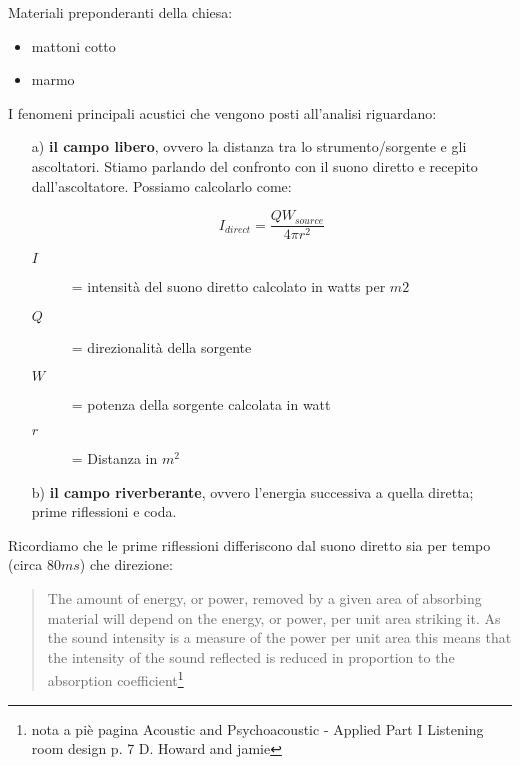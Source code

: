 Materiali preponderanti della chiesa:

\begin{itemize}
	\item mattoni cotto
	\item marmo
\end{itemize}

I fenomeni principali acustici che vengono posti all'analisi riguardano:

\begin{enumerate}
	\item[a)] \textbf{il campo libero}, ovvero la distanza tra lo strumento/sorgente e gli ascoltatori. 
Stiamo parlando del confronto con il suono diretto e recepito dall'ascoltatore. Possiamo calcolarlo come:

\begin{equation}
I_{direct} = \frac{QW_{source}}{4\pi r^2}
\end{equation}

	\begin{description}
		\item[$I$] = intensità del suono diretto calcolato in watts per $m2$
		\item[$Q$] = direzionalità della sorgente 
		\item[$W$] = potenza della sorgente calcolata in watt 
		\item[$r$] = Distanza in $m^2$
	\end{description}
		
	\item[b)] \textbf{il campo riverberante}, ovvero l'energia successiva a quella diretta; prime riflessioni e coda.

\end{enumerate}

Ricordiamo che le prime riflessioni differiscono dal suono diretto sia per tempo (circa $80ms$) che direzione:


\begin{quote}

The amount of energy, or power, removed by a given area of absorbing material will depend on the energy,
or power, per unit area striking it. As the sound intensity is a measure of the power per unit area this
means that the intensity of the sound reflected is reduced in proportion to the absorption
coefficient\footnote{nota a piè pagina Acoustic and Psychoacoustic - Applied Part I Listening room design p. 7 D. Howard and jamie}

\end{quote}

